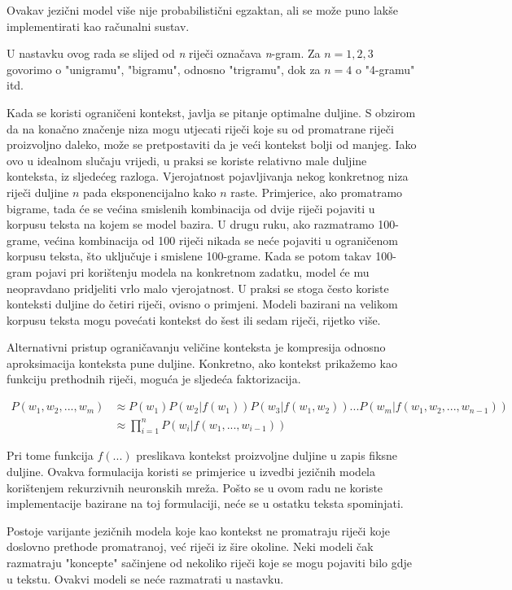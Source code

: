 \documentclass[times, utf8, diplomski, numeric]{fer}
\begin{document}
Ovakav jezični model više nije probabilistični egzaktan, ali se može puno lakše implementirati kao računalni sustav.

U nastavku ovog rada se slijed od \textit{n} riječi označava \textit{n}-gram. Za $n=1, 2, 3$ govorimo o "unigramu", "bigramu", odnosno "trigramu", dok za $n=4$ o "4-gramu" itd.

Kada se koristi ograničeni kontekst, javlja se pitanje optimalne duljine. S obzirom da na konačno značenje niza mogu utjecati riječi koje su od promatrane riječi proizvoljno daleko, može se pretpostaviti da je veći kontekst bolji od manjeg. Iako ovo u idealnom slučaju vrijedi, u praksi se koriste relativno male duljine konteksta, iz sljedećeg razloga. Vjerojatnost pojavljivanja nekog konkretnog niza riječi duljine $n$ pada eksponencijalno kako $n$ raste. Primjerice, ako promatramo bigrame, tada će se većina smislenih kombinacija od dvije riječi pojaviti u korpusu teksta na kojem se model bazira. U drugu ruku, ako razmatramo 100-grame, većina kombinacija od 100 riječi nikada se neće pojaviti u ograničenom korpusu teksta, što uključuje i smislene 100-grame. Kada se potom takav 100-gram pojavi pri korištenju modela na konkretnom zadatku, model će mu neopravdano pridjeliti vrlo malo vjerojatnost. U praksi se stoga često koriste konteksti duljine do četiri riječi, ovisno o primjeni. Modeli bazirani na velikom korpusu teksta mogu povećati kontekst do šest ili sedam riječi, rijetko više. 

Alternativni pristup ograničavanju veličine konteksta je kompresija odnosno aproksimacija konteksta pune duljine. Konkretno, ako kontekst prikažemo kao funkciju prethodnih riječi, moguća je sljedeća faktorizacija.

\begin{align*}
P(w_1, w_2, ... , w_m)
  &\approx P(w_1) P(w_2 | f(w_1)) P(w_3 | f(w_1, w_2)) ... P(w_m | f(w_1, w_2, ... , w_{n - 1 })) \\
  &\approx \prod_{i = 1}^n{P(w_i | f(w_1, ... , w_{i - 1}))}
\end{align*}

Pri tome funkcija $f(...)$ preslikava kontekst proizvoljne duljine u zapis fiksne duljine. Ovakva formulacija koristi se primjerice u izvedbi jezičnih modela korištenjem rekurzivnih neuronskih mreža. Pošto se u ovom radu ne koriste implementacije bazirane na toj formulaciji, neće se u ostatku teksta spominjati.

Postoje varijante jezičnih modela koje kao kontekst ne promatraju riječi koje doslovno prethode promatranoj, već riječi iz šire okoline. Neki modeli čak razmatraju "koncepte" sačinjene od nekoliko riječi koje se mogu pojaviti bilo gdje u tekstu. Ovakvi modeli se neće razmatrati u nastavku.
\end{document}
